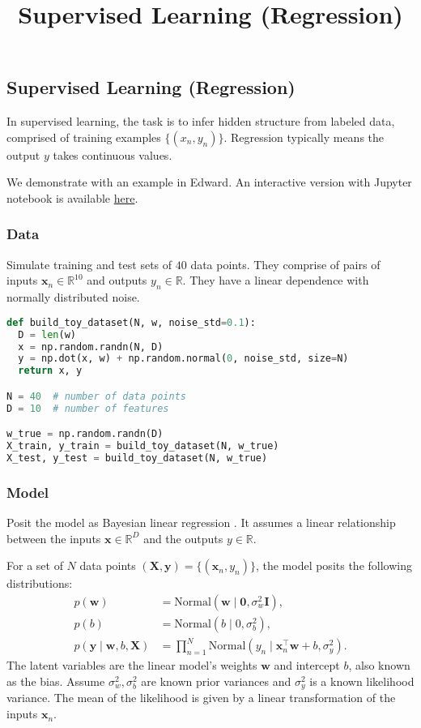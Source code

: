 \title{Supervised Learning (Regression)}

\subsection{Supervised Learning (Regression)}

In supervised learning, the task is to infer hidden structure from
labeled data, comprised of training examples $\{(x_n, y_n)\}$.
Regression typically means the output $y$ takes continuous values.

We demonstrate with an example in Edward.
An interactive version with Jupyter notebook is available
\href{http://nbviewer.jupyter.org/github/blei-lab/edward/blob/master/notebooks/supervised_regression.ipynb}{here}.

\subsubsection{Data}

Simulate training and test sets of $40$ data points. They comprise of
pairs of inputs $\mathbf{x}_n\in\mathbb{R}^{10}$ and outputs
$y_n\in\mathbb{R}$. They have a linear dependence with normally
distributed noise.

\begin{lstlisting}[language=Python]
def build_toy_dataset(N, w, noise_std=0.1):
  D = len(w)
  x = np.random.randn(N, D)
  y = np.dot(x, w) + np.random.normal(0, noise_std, size=N)
  return x, y

N = 40  # number of data points
D = 10  # number of features

w_true = np.random.randn(D)
X_train, y_train = build_toy_dataset(N, w_true)
X_test, y_test = build_toy_dataset(N, w_true)
\end{lstlisting}

\subsubsection{Model}

Posit the model as Bayesian linear regression \citep{murphy2012machine}.
It assumes a linear relationship between the inputs
$\mathbf{x}\in\mathbb{R}^D$ and the outputs $y\in\mathbb{R}$.

For a set of $N$ data points $(\mathbf{X},\mathbf{y})=\{(\mathbf{x}_n, y_n)\}$,
the model posits the following distributions:
\begin{align*}
  p(\mathbf{w})
  &=
  \text{Normal}(\mathbf{w} \mid \mathbf{0}, \sigma_w^2\mathbf{I}),
  \\[1.5ex]
  p(b)
  &=
  \text{Normal}(b \mid 0, \sigma_b^2),
  \\
  p(\mathbf{y} \mid \mathbf{w}, b, \mathbf{X})
  &=
  \prod_{n=1}^N
  \text{Normal}(y_n \mid \mathbf{x}_n^\top\mathbf{w} + b, \sigma_y^2).
\end{align*}
The latent variables are the linear model's weights $\mathbf{w}$ and
intercept $b$, also known as the bias.
Assume $\sigma_w^2,\sigma_b^2$ are known prior variances and $\sigma_y^2$ is a
known likelihood variance. The mean of the likelihood is given by a
linear transformation of the inputs $\mathbf{x}_n$.

